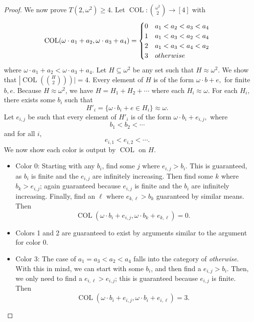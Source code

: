 \documentclass[11pt]{article}
\newcommand{\om}{\omega}
\newcommand{\oequiv}{\approx}
\newcommand{\COL}{\operatorname{COL}}
\newcommand{\commonconst}{a}
\newcommand{\rareconst}{b}
\theoremstyle{plain}
\theoremstyle{definition}
\begin{document}
\begin{proof}
We now prove $T\left(2, \om^2\right) \geq  4$.
Let $\COL \colon \binom{\om^2}{2} \to [4]$ with \begin{align*}
\COL(\om \cdot \commonconst_1 + \commonconst_2, \om \cdot \commonconst_3 + \commonconst_4) = 
\begin{cases}
0 & \commonconst_1 < \commonconst_2 < \commonconst_3 < \commonconst_4\\
1 & \commonconst_1 < \commonconst_3 < \commonconst_2 < \commonconst_4\\
2 & \commonconst_1 < \commonconst_3 < \commonconst_4 < \commonconst_2\\
3 & \textnormal{otherwise}
\end{cases}
\end{align*}
where $\om \cdot \commonconst_1 + \commonconst_2 < \om \cdot \commonconst_3 + \commonconst_4$. 
Let $H \subseteq \omega^2$ be any set such that $H\oequiv \omega^2$. 
We show that $\left|\COL\left(\binom{H}{2}\right)\right)|=4$. Every element of $H$ is of the form $\omega \cdot \rareconst + e,$ for finite $\rareconst,e.$ Because $H \oequiv \om^2$, we have $H = H_1+H_2+ \cdots$ where each $H_i \oequiv \omega$. For each $H_i,$ there exists some $\rareconst_i$ such that $$
H'_i = \{\omega \cdot \rareconst_i + e \in H_i\} \oequiv \om.
$$ Let $e_{i,j}$ be such that every element of $H'_i$ is of the form $\omega \cdot \rareconst_i + e_{i,j},$
where
$$\rareconst_1 < \rareconst_2 < \cdots$$
and for all $i$, 
$$e_{i,1} < e_{i,2} < \cdots.$$
We now show each color is output by $\COL$ on $H$.
\begin{itemize}
    \item Color 0: Starting with any $\rareconst_i$, find some $j$ where $e_{i, j} > \rareconst_i$. This is guaranteed, as $\rareconst_i$ is finite and the $e_{i, j}$ are infinitely increasing. Then find some $k$ where $\rareconst_k > e_{i, j}$; again guaranteed because $e_{i, j}$ is finite and the $\rareconst_i$ are infinitely increasing. Finally, find an
    $\ell$ where $e_{k ,\ell} > \rareconst_k$ guaranteed by similar means. Then 
    $$\COL(\omega\cdot \rareconst_i + e_{i, j}, \omega\cdot \rareconst_k + e_{k, \ell})=0.$$
    \item Colors 1 and 2 are guaranteed to exist by arguments similar to the argument for color 0.
    \item Color 3: The case of $\commonconst_1=\commonconst_3<\commonconst_2<\commonconst_4$ falls into the category of {\it otherwise}. With this in mind, we can start with some $\rareconst_i$, and then find a $e_{i, j} > \rareconst_i$. Then, we only need to find a $e_{i, \ell} > e_{i, j}$; this is guaranteed because $e_{i, j}$ is finite. Then $$\COL(\omega\cdot \rareconst_i + e_{i, j}, \omega\cdot \rareconst_i + e_{i, \ell})=3.$$
\end{itemize}

 
\end{proof}
\end{document}
